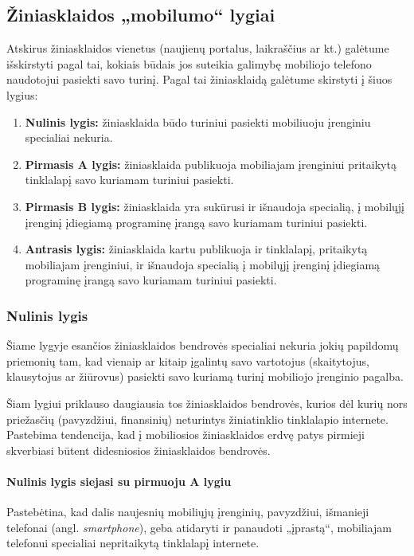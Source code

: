 \documentclass[kursinis-darbas]{vukf}
\begin{document}
\subsection{Žiniasklaidos „mobilumo“ lygiai}

Atskirus žiniasklaidos vienetus (naujienų portalus, laikraščius ar kt.) galėtume išskirstyti pagal tai, kokiais būdais jos suteikia galimybę mobiliojo telefono naudotojui pasiekti savo turinį. Pagal tai žiniasklaidą galėtume skirstyti į šiuos lygius:

\begin{enumerate}
	\item \textbf{Nulinis lygis:} žiniasklaida būdo turiniui pasiekti mobiliuoju įrenginiu specialiai nekuria.
	\item \textbf{Pirmasis A lygis:} žiniasklaida publikuoja mobiliajam įrenginiui pritaikytą tinklalapį savo kuriamam turiniui pasiekti.
	\item \textbf{Pirmasis B lygis:} žiniasklaida yra sukūrusi ir išnaudoja specialią, į mobilųjį įrenginį įdiegiamą programinę įrangą savo kuriamam turiniui pasiekti.
	\item \textbf{Antrasis lygis:} žiniasklaida kartu publikuoja ir tinklalapį, pritaikytą mobiliajam įrenginiui, ir išnaudoja specialią į mobilųjį įrenginį įdiegiamą programinę įrangą savo kuriamam turiniui pasiekti.
\end{enumerate}


\subsubsection{Nulinis lygis}

Šiame lygyje esančios žiniasklaidos bendrovės specialiai nekuria jokių papildomų priemonių tam, kad vienaip ar kitaip įgalintų savo vartotojus (skaitytojus, klausytojus ar žiūrovus) pasiekti savo kuriamą turinį mobiliojo įrenginio pagalba.

Šiam lygiui priklauso daugiausia tos žiniasklaidos bendrovės, kurios dėl kurių nors priežasčių (pavyzdžiui, finansinių) neturintys žiniatinklio tinklalapio internete. Pastebima tendencija, kad į mobiliosios žiniasklaidos erdvę patys pirmieji skverbiasi būtent didesniosios žiniasklaidos bendrovės.

\paragraph{Nulinis lygis siejasi su pirmuoju A lygiu}

Pastebėtina, kad dalis naujesnių mobiliųjų įrenginių, pavyzdžiui, išmanieji telefonai (angl. \emph{smartphone}), geba atidaryti ir panaudoti „įprastą“, mobiliajam telefonui specialiai nepritaikytą tinklalapį internete.
\end{document}

